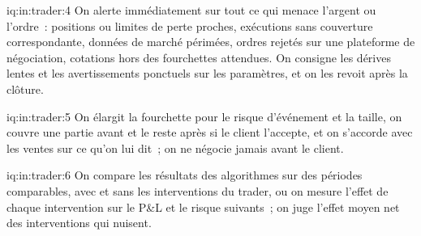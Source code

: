 \begin{solution}{iq:in:trader:4}
On alerte immédiatement sur tout ce qui menace l'argent ou l'ordre~: positions ou limites de perte proches, exécutions sans couverture correspondante,
données de marché périmées, ordres rejetés sur une plateforme de négociation, cotations hors des fourchettes attendues. On consigne les dérives lentes et les avertissements ponctuels
sur les paramètres, et on les revoit après la clôture.
\end{solution}

\begin{solution}{iq:in:trader:5}
On élargit la fourchette pour le risque d'événement et la taille, on couvre une partie avant et le reste après si le client l'accepte, et on s'accorde avec les ventes
sur ce qu'on lui dit~; on ne négocie jamais avant le client.
\end{solution}

\begin{solution}{iq:in:trader:6}
On compare les résultats des algorithmes sur des périodes comparables, avec et sans les interventions du trader, ou on mesure l'effet de chaque
intervention sur le P\&L et le risque suivants~; on juge l'effet moyen net des interventions qui nuisent.
\end{solution}
